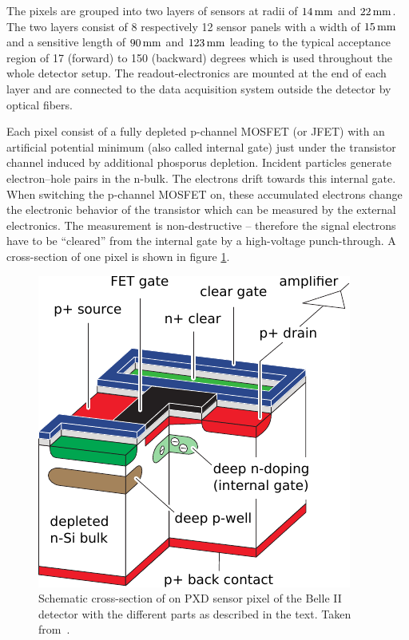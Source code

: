 The pixels are grouped into two layers of sensors at radii of $\unit[14]{mm}$ and $\unit[22]{mm}$. The two layers consist of 8 respectively 12 sensor panels with a width of $\unit[15]{mm}$ and a sensitive length of $\unit[90]{mm}$ and $\unit[123]{mm}$ leading to the typical acceptance region of 17 (forward) to 150 (backward) degrees which is used throughout the whole detector setup. The readout-electronics are mounted at the end of each layer and are connected to the data acquisition system outside the detector by optical fibers.

Each pixel consist of a fully depleted p-channel MOSFET (or JFET) with an artificial potential minimum (also called internal gate) just under the transistor channel induced by additional phosporus depletion. Incident particles generate electron--hole pairs in the n-bulk. The electrons drift towards this internal gate. When switching the p-channel MOSFET on, these accumulated electrons change the electronic behavior of the transistor which can be measured by the external electronics. The measurement is non-destructive -- therefore the signal electrons have to be ``cleared'' from the internal gate by a high-voltage punch-through. A cross-section of one pixel is shown in figure \ref{fig-pxd-schema}.

\begin{figure}
  \centering
  \includegraphics[width=0.6\linewidth]{figures/experimental_setup/pxd.pdf}
  \caption[Cross-section of a PXD sensor]{Schematic cross-section of on PXD sensor pixel of the Belle II detector with the different parts as described in the text. Taken from~\cite{tdr}.}
  \label{fig-pxd-schema}
\end{figure}


